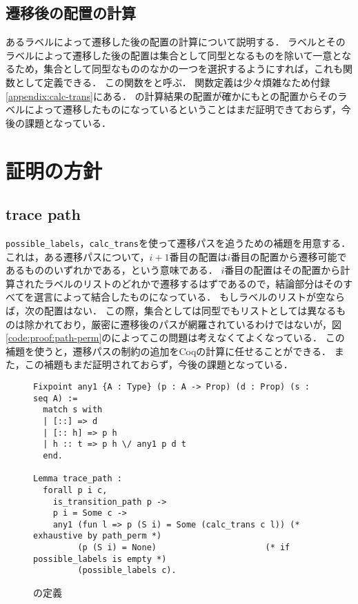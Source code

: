 \subsection{遷移後の配置の計算}

あるラベルによって遷移した後の配置の計算について説明する．
ラベルとそのラベルによって遷移した後の配置は集合として同型となるものを除いて一意となるため，集合として同型なもののなかの一つを選択するようにすれば，これも関数として定義できる．
この関数をと呼ぶ．
関数定義は少々煩雑なため付録\ref{appendix:calc-trans}にある．
の計算結果の配置が確かにもとの配置からそのラベルによって遷移したものになっているということはまだ証明できておらず，今後の課題となっている．

\section{証明の方針}

\subsection{trace path}

\lstinline{possible_labels}，\lstinline{calc_trans}を使って遷移パスを追うための補題を用意する．
これは，ある遷移パスについて，$i + 1$番目の配置は$i$番目の配置から遷移可能であるもののいずれかである，という意味である．
$i$番目の配置はその配置から計算されたラベルのリストのどれかで遷移するはずであるので，結論部分はそのすべてを選言によって結合したものになっている．
もしラベルのリストが空ならば，次の配置はない．
この際，集合としては同型でもリストとしては異なるものは除かれており，厳密に遷移後のパスが網羅されているわけではないが，図\ref{code:proof:path-perm}のによってこの問題は考えなくてよくなっている．
この補題を使うと，遷移パスの制約の追加をCoqの計算に任せることができる．
また，この補題もまだ証明されておらず，今後の課題となっている．


\begin{figure}
\begin{lstlisting}
Fixpoint any1 {A : Type} (p : A -> Prop) (d : Prop) (s : seq A) :=
  match s with
  | [::] => d
  | [:: h] => p h
  | h :: t => p h \/ any1 p d t
  end.

Lemma trace_path :
  forall p i c,
    is_transition_path p ->
    p i = Some c ->
    any1 (fun l => p (S i) = Some (calc_trans c l)) (* exhaustive by path_perm *)
         (p (S i) = None)                      (* if possible_labels is empty *)
         (possible_labels c).
\end{lstlisting}
\label{code:proof:trace-path}
\caption{の定義}
\end{figure}


